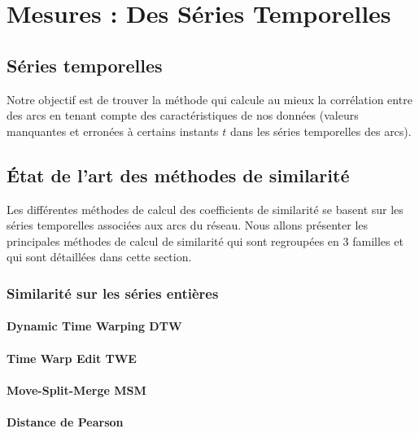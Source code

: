 

\chapter{Mesures : Des S\'eries Temporelles}
\label{timeSeries}


\section{S\'eries temporelles}



Notre objectif est de trouver la m\'ethode qui calcule au mieux la corr\'elation entre des arcs en tenant compte des caract\'eristiques de nos donn\'ees (valeurs manquantes et erron\'ees \`a certains instants $t$ dans les s\'eries temporelles des arcs).


\section{\'Etat de l'art des m\'ethodes de similarit\'e}
Les diff\'erentes m\'ethodes de calcul des coefficients de similarit\'e se basent sur les s\'eries temporelles associ\'ees aux arcs du r\'eseau.
Nous allons pr\'esenter les principales m\'ethodes de calcul de similarit\'e qui sont regroup\'ees en $3$ familles et qui sont d\'etaill\'ees dans cette section.
\subsection{ Similarit\'e sur les s\'eries enti\`eres}
	\label{seriesEntieres}
	
	\subsubsection{Dynamic Time Warping  DTW}
		
	\subsubsection{Time Warp Edit TWE}
		
	\subsubsection{Move-Split-Merge MSM}
		
	\subsubsection{Distance de Pearson}
		
